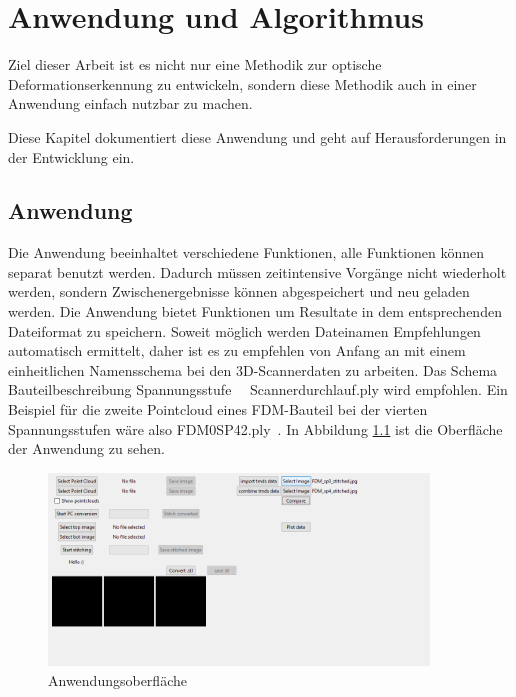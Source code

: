 
\chapter{Anwendung und Algorithmus}

Ziel dieser Arbeit ist es nicht nur eine Methodik zur optische 
Deformationserkennung zu entwickeln, sondern diese Methodik auch in einer 
Anwendung einfach nutzbar zu machen. 

Diese Kapitel dokumentiert diese Anwendung und geht auf Herausforderungen 
in der Entwicklung ein.

\section{Anwendung}

Die Anwendung beeinhaltet verschiedene Funktionen, alle Funktionen 
können separat benutzt werden. Dadurch müssen zeitintensive Vorgänge nicht 
wiederholt werden, sondern Zwischenergebnisse können abgespeichert und 
neu geladen werden.
Die Anwendung bietet Funktionen um Resultate in dem entsprechenden Dateiformat zu 
speichern. Soweit möglich werden Dateinamen Empfehlungen automatisch ermittelt, 
daher ist es zu empfehlen von Anfang an mit einem einheitlichen Namensschema bei
den 3D-Scannerdaten zu arbeiten. 
Das Schema \glqq Bauteilbeschreibung \textunderscore Spannungsstufe\grqq~~
\textunderscore Scannerdurchlauf.ply
wird empfohlen. Ein Beispiel für die zweite Pointcloud eines FDM-Bauteil bei der
vierten Spannungsstufen wäre also \glqq FDM0\textunderscore SP4\textunderscore 2.ply\grqq~.
In Abbildung \ref{fig:software_screenshot} ist die Oberfläche der Anwendung zu sehen.

\begin{figure}[H]
    \centering
    \includegraphics[width=0.9\textwidth]{images/software_screenshot.png}
    \caption{Anwendungsoberfläche}
    \label{fig:software_screenshot}
\end{figure}

